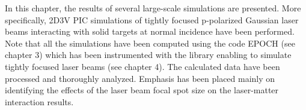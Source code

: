 In this chapter, the results of several large-scale simulations are presented. More specifically, 2D3V PIC simulations of tightly focused p-polarized Gaussian laser beams interacting with solid targets at normal incidence have been performed. Note that all the simulations have been computed using the code EPOCH (see chapter 3) which has been instrumented with the library enabling to simulate tightly focused laser beams (see chapter 4). The calculated data have been processed and thoroughly analyzed. Emphasis has been placed mainly on identifying the effects of the laser beam focal spot size on the laser-matter interaction results.